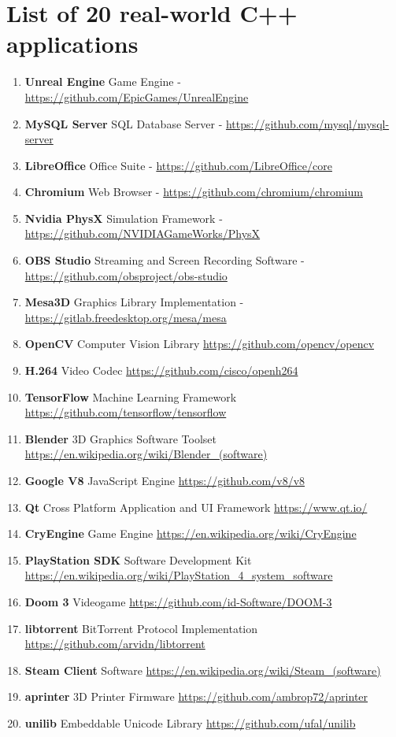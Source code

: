 \documentclass{article}
\begin{document}
 \section*{List of 20 real-world C++ applications}
\begin{enumerate}
 \item\textbf{Unreal Engine} Game Engine - \url{https://github.com/EpicGames/UnrealEngine}
 \item\textbf{MySQL Server} SQL Database Server - \url{https://github.com/mysql/mysql-server}
 \item\textbf{LibreOffice} Office Suite - \url{https://github.com/LibreOffice/core}
 \item\textbf{Chromium} Web Browser	- \url{https://github.com/chromium/chromium}
 \item\textbf{Nvidia PhysX} Simulation Framework - \url{https://github.com/NVIDIAGameWorks/PhysX}
 \item\textbf{OBS Studio} Streaming and Screen Recording Software - \url{https://github.com/obsproject/obs-studio}
 \item\textbf{Mesa3D} Graphics Library Implementation - \url{https://gitlab.freedesktop.org/mesa/mesa}
 \item\textbf{OpenCV} Computer Vision Library \url{https://github.com/opencv/opencv}
 \item\textbf{H.264} Video Codec \url{https://github.com/cisco/openh264}
 \item\textbf{TensorFlow} Machine Learning Framework \url{https://github.com/tensorflow/tensorflow}
 \item\textbf{Blender} 3D Graphics Software Toolset \url{https://en.wikipedia.org/wiki/Blender_(software)}
 \item\textbf{Google V8} JavaScript Engine \url{https://github.com/v8/v8}
 \item\textbf{Qt} Cross Platform Application and UI Framework \url{https://www.qt.io/}
 \item\textbf{CryEngine} Game Engine \url{https://en.wikipedia.org/wiki/CryEngine}
 \item\textbf{PlayStation SDK} Software Development Kit \url{https://en.wikipedia.org/wiki/PlayStation_4_system_software}
 \item\textbf{Doom 3} Videogame \url{https://github.com/id-Software/DOOM-3}
 \item\textbf{libtorrent} BitTorrent Protocol Implementation \url{https://github.com/arvidn/libtorrent}
 \item\textbf{Steam Client} Software \url{https://en.wikipedia.org/wiki/Steam_(software)}
 \item\textbf{aprinter} 3D Printer Firmware \url{https://github.com/ambrop72/aprinter}
 \item\textbf{unilib} Embeddable Unicode Library \url{https://github.com/ufal/unilib}
\end{enumerate}
 
\end{document}
